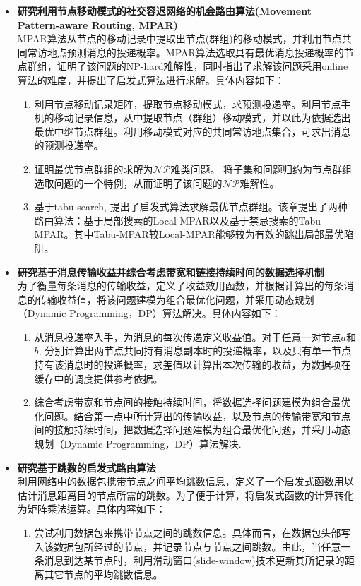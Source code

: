 \begin{itemize}
\item \textbf{研究利用节点移动模式的社交容迟网络的机会路由算法(Movement Pattern-aware Routing, MPAR)}\\
MPAR算法从节点的移动记录中提取出节点(群组)的移动模式，并利用节点共同常访地点预测消息的投递概率。MPAR算法选取具有最优消息投递概率的节点群组，证明了该问题的NP-hard难解性，同时指出了求解该问题采用online算法的难度，并提出了启发式算法进行求解。具体内容如下：
\begin{enumerate}
\item 利用节点移动记录矩阵，提取节点移动模式，求预测投递率。利用节点手机的移动记录信息，从中提取节点（群组）移动模式，并以此为依据选出最优中继节点群组。利用移动模式对应的共同常访地点集合，可求出消息的预测投递率。

\item 证明最优节点群组的求解为$\mathcal{NP}$难类问题。
将子集和问题归约为节点群组选取问题的一个特例，从而证明了该问题的$\mathcal{NP}$难解性。

\item 基于tabu-search, 提出了启发式算法求解最优节点群组。该章提出了两种路由算法：基于局部搜索的Local-MPAR以及基于禁忌搜索的Tabu-MPAR。其中Tabu-MPAR较Local-MPAR能够较为有效的跳出局部最优陷阱。
\end{enumerate}


\item \textbf{研究基于消息传输收益并综合考虑带宽和链接持续时间的数据选择机制}\\
为了衡量每条消息的传输收益，定义了收益效用函数，并根据计算出的每条消息的传输收益值，将该问题建模为组合最优化问题，并采用动态规划（Dynamic Programming，DP）算法解决。具体内容如下：
\begin{enumerate}
\item 从消息投递率入手，为消息的每次传递定义收益值。对于任意一对节点$a$和$b$, 分别计算出两节点共同持有消息副本时的投递概率，以及只有单一节点持有该消息时的投递概率，求差值以计算出本次传输的收益，为数据项在缓存中的调度提供参考依据。
\item 综合考虑带宽和节点间的接触持续时间，将数据选择问题建模为组合最优化问题。结合第一点中所计算出的传输收益，以及节点的传输带宽和节点间的接触持续时间，把数据选择问题建模为组合最优化问题，并采用动态规划（Dynamic Programming，DP）算法解决.
\end{enumerate}

\item \textbf{研究基于跳数的启发式路由算法}\\
利用网络中的数据包携带节点之间平均跳数信息，定义了一个启发式函数用以估计消息距离目的节点所需的跳数。为了便于计算，将启发式函数的计算转化为矩阵乘法运算。具体内容如下：
\begin{enumerate}
\item 尝试利用数据包来携带节点之间的跳数信息。具体而言，在数据包头部写入该数据包所经过的节点，并记录节点与节点之间跳数。由此，当任意一条消息到达某节点时，利用滑动窗口(slide-window)技术更新其所记录的距离其它节点的平均跳数信息。


\end{enumerate}
\end{itemize}
